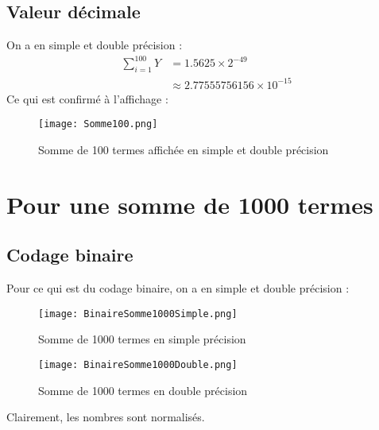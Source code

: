 \documentclass[a4paper, titlepage]{livret} %
\begin{document}
			\subsection{Valeur décimale}
				On a en simple et double précision :
				\[\begin{aligned}
				  \sum_{i=1}^{100} Y & = 1.5625\times2^{-49}\\
									 & \approx 2.77555756156\times10^{-15}
				\end{aligned}\]
				Ce qui est confirmé à l'affichage :
				\begin{figure}[!h]
					\centering
  						\texttt{[image: Somme100.png]}
  						\caption{Somme de 100 termes affichée en simple et double précision}
				\end{figure}

		\section{Pour une somme de 1000 termes}
			\subsection{Codage binaire}
				Pour ce qui est du codage binaire, on a en simple et double précision :
				\begin{figure}[!h]
					\centering
  						\texttt{[image: BinaireSomme1000Simple.png]}
  						\caption{Somme de 1000 termes en simple précision}
				\end{figure}
				\begin{figure}[!h]
					\centering
  						\texttt{[image: BinaireSomme1000Double.png]}
  						\caption{Somme de 1000 termes en double précision}
				\end{figure}

				Clairement, les nombres sont normalisés.
\end{document}
